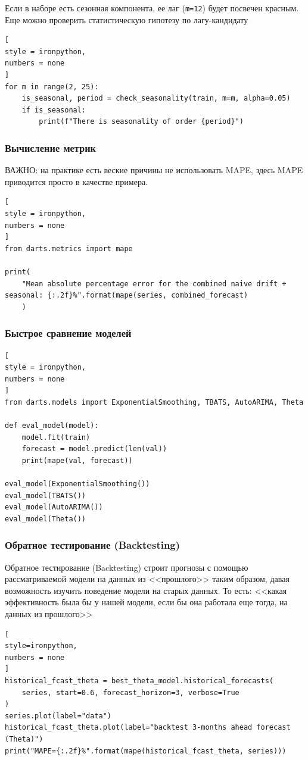 \documentclass[%
	11pt,
	a4paper,
	utf8,
		]{article}
\begin{document}
Если в наборе есть сезонная компонента, ее лаг (\verb|m=12|) будет посвечен красным. Еще можно проверить статистическую гипотезу по лагу-кандидату
\begin{lstlisting}[
style = ironpython,
numbers = none
]
for m in range(2, 25):
    is_seasonal, period = check_seasonality(train, m=m, alpha=0.05)
    if is_seasonal:
        print(f"There is seasonality of order {period}")
\end{lstlisting}

\subsubsection{Вычисление метрик}

ВАЖНО: на практике есть веские причины {\color{red}не использовать MAPE}, здесь MAPE приводится просто в качестве примера.

\begin{lstlisting}[
style = ironpython,
numbers = none
]
from darts.metrics import mape

print(
    "Mean absolute percentage error for the combined naive drift + seasonal: {:.2f}%".format(mape(series, combined_forecast)
    )
\end{lstlisting}

\subsubsection{Быстрое сравнение моделей}

\begin{lstlisting}[
style = ironpython,
numbers = none
]
from darts.models import ExponentialSmoothing, TBATS, AutoARIMA, Theta

def eval_model(model):
    model.fit(train)
    forecast = model.predict(len(val))
    print(mape(val, forecast))
    
eval_model(ExponentialSmoothing())
eval_model(TBATS())
eval_model(AutoARIMA())
eval_model(Theta())
\end{lstlisting}

\subsubsection{Обратное тестирование (Backtesting)}

Обратное тестирование (Backtesting) строит прогнозы с помощью рассматриваемой модели на данных из <<прошлого>> таким образом, давая возможность изучить поведение модели на старых данных. То есть: <<какая эффективность была бы у нашей модели, если бы она работала еще тогда, на данных из прошлого>>
\begin{lstlisting}[
style=ironpython,
numbers = none
]
historical_fcast_theta = best_theta_model.historical_forecasts(
    series, start=0.6, forecast_horizon=3, verbose=True
)
series.plot(label="data")
historical_fcast_theta.plot(label="backtest 3-months ahead forecast (Theta)")
print("MAPE={:.2f}%".format(mape(historical_fcast_theta, series)))
\end{lstlisting}
\end{document}

